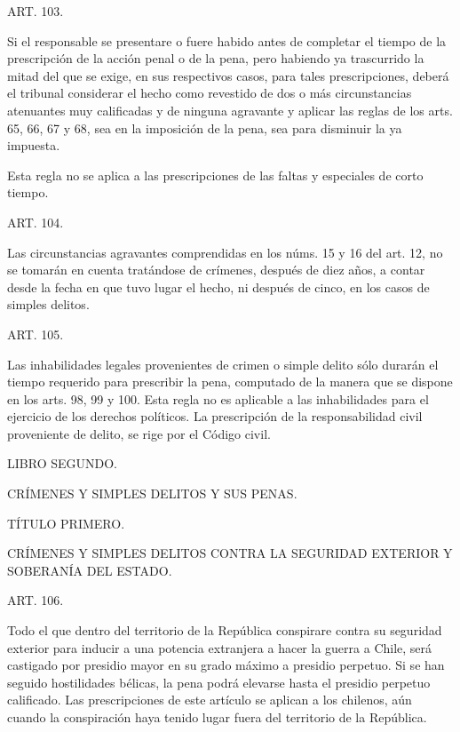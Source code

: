     ART. 103.

    Si el responsable se presentare o fuere habido antes de completar el tiempo de la prescripción de la acción penal o de la pena, pero habiendo ya trascurrido la mitad del que se exige, en sus respectivos casos, para tales prescripciones, deberá el tribunal considerar el hecho como revestido de dos o más circunstancias atenuantes muy calificadas y de ninguna agravante y aplicar las reglas de los arts. 65, 66, 67 y 68, sea en la imposición de la pena, sea para disminuir la ya impuesta.

    Esta regla no se aplica a las prescripciones de las faltas y especiales de corto tiempo.

    ART. 104.

    Las circunstancias agravantes comprendidas en los núms. 15 y 16 del art. 12, no se tomarán en cuenta tratándose de crímenes, después de diez años, a contar desde la fecha en que tuvo lugar el hecho, ni después de cinco, en los casos de simples delitos.


    ART. 105.

    Las inhabilidades legales provenientes de crimen o simple delito sólo durarán el tiempo requerido para prescribir la pena, computado de la manera que se dispone en los arts. 98, 99 y 100. Esta regla no es aplicable a las inhabilidades para el ejercicio de los derechos políticos.
    La prescripción de la responsabilidad civil proveniente de delito, se rige por el Código civil.




    LIBRO SEGUNDO.

    CRÍMENES Y SIMPLES DELITOS Y SUS PENAS.





    TÍTULO PRIMERO.

    CRÍMENES Y SIMPLES DELITOS CONTRA LA SEGURIDAD EXTERIOR Y SOBERANÍA DEL ESTADO.




    ART. 106.

    Todo el que dentro del territorio de la República conspirare contra su seguridad exterior para inducir a una potencia extranjera a hacer la guerra a Chile, será castigado por presidio mayor en su grado máximo a presidio perpetuo. Si se han seguido hostilidades bélicas, la pena podrá elevarse hasta el presidio perpetuo calificado.
    Las prescripciones de este artículo se aplican a los chilenos, aún cuando la conspiración haya tenido lugar fuera del territorio de la República.

